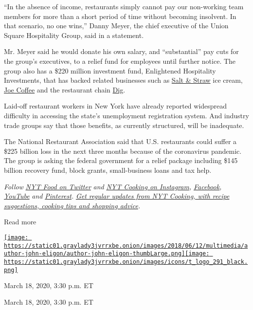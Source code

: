 ``In the absence of income, restaurants simply cannot pay our
non-working team members for more than a short period of time without
becoming insolvent. In that scenario, no one wins,'' Danny Meyer, the
chief executive of the Union Square Hospitality Group, said in a
statement.

Mr. Meyer said he would donate his own salary, and ``substantial'' pay
cuts for the group's executives, to a relief fund for employees until
further notice. The group also has a \$220 million investment fund,
Enlightened Hospitality Investments, that has backed related businesses
such as \href{https://saltandstraw.com/}{Salt \& Straw} ice cream,
\href{https://joecoffeecompany.com/}{Joe Coffee} and the restaurant
chain \href{https://www.diginn.com/}{Dig}.

Laid-off restaurant workers in New York have already reported widespread
difficulty in accessing the state's unemployment registration system.
And industry trade groups say that those benefits, as currently
structured, will be inadequate.

The National Restaurant Association said that U.S. restaurants could
suffer a \$225 billion loss in the next three months because of the
coronavirus pandemic. The group is asking the federal government for a
relief package including \$145 billion recovery fund, block grants,
small-business loans and tax help.

\emph{Follow} \href{https://twitter.com/nytfood}{\emph{NYT Food on
Twitter}} \emph{and}
\href{https://www.instagram.com/nytcooking/}{\emph{NYT Cooking on
Instagram}}\emph{,}
\href{https://www.facebookcorewwwi.onion/nytcooking/}{\emph{Facebook}}\emph{,}
\href{https://www.youtube.com/nytcooking}{\emph{YouTube}} \emph{and}
\href{https://www.pinterest.com/nytcooking/}{\emph{Pinterest}}\emph{.}
\href{https://www.nytimes3xbfgragh.onion/newsletters/cooking}{\emph{Get
regular updates from NYT Cooking, with recipe suggestions, cooking tips
and shopping advice}}\emph{.}

Read more

\href{https://www.nytimes3xbfgragh.onion/by/john-eligon}{\texttt{[image: https://static01.graylady3jvrrxbe.onion/images/2018/06/12/multimedia/author-john-eligon/author-john-eligon-thumbLarge.png]}}\href{https://www.nytimes3xbfgragh.onion/by/nellie-bowles}{\texttt{[image: https://static01.graylady3jvrrxbe.onion/images/icons/t\_logo\_291\_black.png]}}

March 18, 2020, 3:30 p.m. ET

March 18, 2020, 3:30 p.m. ET

